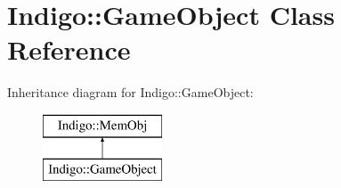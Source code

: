 \hypertarget{class_indigo_1_1_game_object}{}\section{Indigo\+:\+:Game\+Object Class Reference}
\label{class_indigo_1_1_game_object}
Inheritance diagram for Indigo\+:\+:Game\+Object\+:\begin{figure}[H]
\begin{center}
\leavevmode
\includegraphics[height=2.000000cm]{class_indigo_1_1_game_object}
\end{center}
\end{figure}
